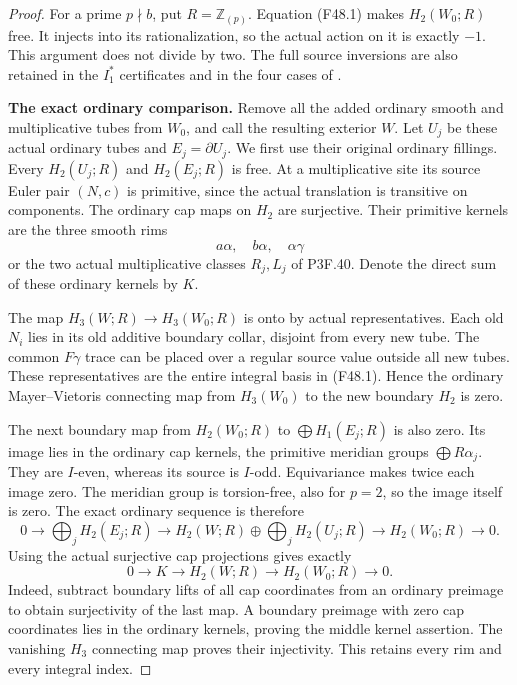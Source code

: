 \begin{proof}
For a prime $p\nmid b$, put $R=\mathbb Z_{(p)}$.
Equation (F48.1) makes $H_2(W_0;R)$ free. It injects into
its rationalization, so the actual action on it is exactly
$-1$. This argument does not divide by two. The full source
inversions are also retained in the $I_1^*$ certificates and
in the four cases of
.

\par\medskip\noindent\textbf{The exact ordinary comparison.}
Remove all the added ordinary smooth and multiplicative tubes
from $W_0$, and call the resulting exterior $W$.
Let $U_j$ be these actual ordinary tubes and $E_j=\partial U_j$.
We first use their original ordinary fillings. Every
$H_2(U_j;R)$ and $H_2(E_j;R)$ is free. At a multiplicative
site its source Euler pair $(N,c)$ is primitive, since the
actual translation is transitive on components.
The ordinary cap maps on $H_2$ are surjective. Their primitive
kernels are the three smooth rims
\[
                    a\alpha,\quad b\alpha,\quad\alpha\gamma
\]
or the two actual multiplicative classes $R_j,L_j$ of P3F.40.
Denote the direct sum of these ordinary kernels by $K$.

The map $H_3(W;R)\to H_3(W_0;R)$ is onto by actual
representatives. Each old $N_i$ lies in its old additive
boundary collar, disjoint from every new tube. The common
$F\gamma$ trace can be placed over a regular source value
outside all new tubes. These representatives are the entire
integral basis in (F48.1). Hence the ordinary Mayer--Vietoris
connecting map from $H_3(W_0)$ to the new boundary $H_2$
is zero.

The next boundary map from $H_2(W_0;R)$ to
$\bigoplus H_1(E_j;R)$ is also zero. Its image lies in the
ordinary cap kernels, the primitive meridian groups
$\bigoplus R\alpha_j$. They are $I$-even, whereas its source
is $I$-odd. Equivariance makes twice each image zero.
The meridian group is torsion-free, also for $p=2$, so the
image itself is zero. The exact ordinary sequence is therefore
\[
 0\longrightarrow\bigoplus_jH_2(E_j;R)
 \longrightarrow H_2(W;R)\oplus\bigoplus_jH_2(U_j;R)
 \longrightarrow H_2(W_0;R)\longrightarrow0.
\]
Using the actual surjective cap projections gives exactly
\[
             0\longrightarrow K\longrightarrow H_2(W;R)
                  \longrightarrow H_2(W_0;R)\longrightarrow0.  \tag{F48.2}
\]
Indeed, subtract boundary lifts of all cap coordinates from an
ordinary preimage to obtain surjectivity of the last map.
A boundary preimage with zero cap coordinates lies in the
ordinary kernels, proving the middle kernel assertion.
The vanishing $H_3$ connecting map proves their injectivity.
This retains every rim and every integral index.


\end{proof}
